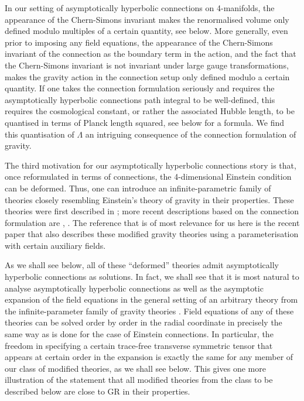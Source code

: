\documentclass[a4paper,12pt]{article}
\begin{document}
In our setting of asymptotically hyperbolic connections on 4-manifolds, the appearance of the Chern-Simons invariant  makes the renormalised volume only defined modulo multiples of a certain quantity, see below. More generally, even prior to imposing any field equations, the appearance of the Chern-Simons invariant of the connection as the boundary term in the action, and the fact that the Chern-Simons invariant is not invariant under large gauge transformations, makes the gravity action in the connection setup only defined modulo a certain quantity. If one takes the connection formulation seriously and requires the asymptotically hyperbolic connections path integral to be well-defined, this requires the cosmological constant, or rather the associated Hubble length, to be quantised in terms of Planck length squared, see below for a formula. We find this quantisation of $\Lambda$ an intriguing consequence of the connection formulation of gravity. 

The third motivation for our asymptotically hyperbolic connections story is that, once reformulated in terms of connections, the 4-dimensional Einstein condition can be deformed. Thus, one can introduce an infinite-parametric family of theories closely resembling Einstein's theory of gravity in their properties. These theories were first described in \cite{Krasnov:2006du}; more recent descriptions based on the connection formulation are \cite{Krasnov:2011up}, \cite{Krasnov:2011pp}. The reference that is of most relevance for us here is the recent paper \cite{Herfray:2015fpa} that also describes these modified gravity theories using a parameterisation with certain auxiliary fields. 

As we shall see below, all of these ``deformed'' theories admit asymptotically hyperbolic connections as solutions. In fact, we shall see that it is most natural to analyse asymptotically hyperbolic connections as well as the asymptotic expansion of the field equations in the general setting of an arbitrary theory from the infinite-parameter family of gravity theories \cite{Krasnov:2006du}. Field equations of any of these theories can be solved order by order in the radial coordinate in precisely the same way as is done for the case of Einstein connections. In particular, the freedom in specifying a certain trace-free transverse symmetric tensor that appears at certain order in the expansion is exactly the same for any member of our class of modified theories, as we shall see below. This gives one more illustration of the statement that all modified theories from the class to be described below are close to GR in their properties. 
\end{document}
